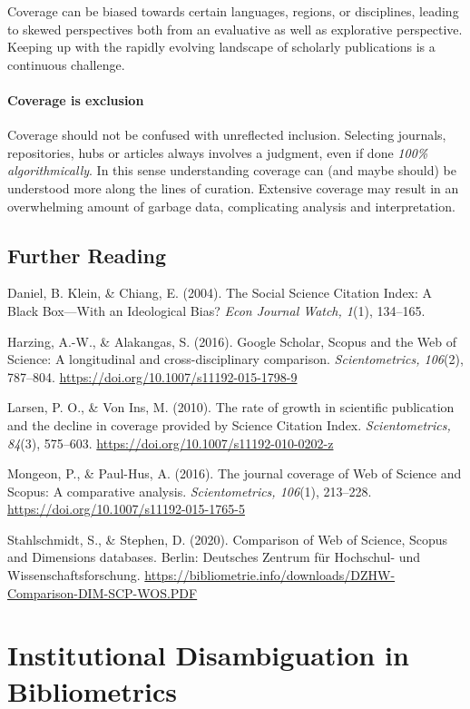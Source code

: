 \documentclass[
  letterpaper,
]{scrreprt}
\begin{document}
Coverage can be biased towards certain languages, regions, or
disciplines, leading to skewed perspectives both from an evaluative as
well as explorative perspective. Keeping up with the rapidly evolving
landscape of scholarly publications is a continuous challenge.

\subsubsection{Coverage is exclusion}\label{coverage-is-exclusion}

Coverage should not be confused with unreflected inclusion. Selecting
journals, repositories, hubs or articles always involves a judgment,
even if done \emph{100\% algorithmically}. In this sense understanding
coverage can (and maybe should) be understood more along the lines of
curation. Extensive coverage may result in an overwhelming amount of
garbage data, complicating analysis and interpretation.

\section{Further Reading}\label{further-reading-2}

Daniel, B. Klein, \& Chiang, E. (2004). The Social Science Citation
Index: A Black Box---With an Ideological Bias? \emph{Econ Journal Watch,
1}(1), 134--165.

Harzing, A.-W., \& Alakangas, S. (2016). Google Scholar, Scopus and the
Web of Science: A longitudinal and cross-disciplinary comparison.
\emph{Scientometrics, 106}(2), 787--804.
\url{https://doi.org/10.1007/s11192-015-1798-9}

Larsen, P. O., \& Von Ins, M. (2010). The rate of growth in scientific
publication and the decline in coverage provided by Science Citation
Index. \emph{Scientometrics, 84}(3), 575--603.
\url{https://doi.org/10.1007/s11192-010-0202-z}

Mongeon, P., \& Paul-Hus, A. (2016). The journal coverage of Web of
Science and Scopus: A comparative analysis. \emph{Scientometrics,
106}(1), 213--228. \url{https://doi.org/10.1007/s11192-015-1765-5}

Stahlschmidt, S., \& Stephen, D. (2020). Comparison of Web of Science,
Scopus and Dimensions databases. Berlin: Deutsches Zentrum für
Hochschul- und Wissenschaftsforschung.
\url{https://bibliometrie.info/downloads/DZHW-Comparison-DIM-SCP-WOS.PDF}

\chapter{Institutional Disambiguation in
Bibliometrics}\label{institutional-disambiguation-in-bibliometrics}
\end{document}
